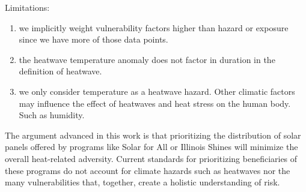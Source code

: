 Limitations:
\begin{enumerate}
  \item we implicitly weight vulnerability factors higher than hazard or exposure since we have more of those data points.
  \item the heatwave temperature anomaly does not factor in duration in the definition
  of heatwave.
  \item we only consider temperature as a heatwave hazard. Other climatic factors
  may influence the effect of heatwaves and heat stress on the human body. Such as
  humidity.
\end{enumerate}

The argument advanced in this work is that prioritizing the distribution of solar
panels offered by programs like Solar for All or Illinois Shines will minimize the
overall heat-related adversity. Current standards for prioritizing beneficiaries
of these programs do not account for climate hazards such as heatwaves nor the
many vulnerabilities that, together, create a holistic understanding of risk.
